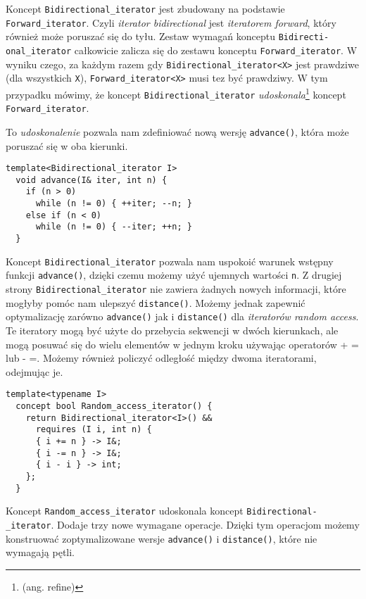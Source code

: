 \documentclass[11pt, a4paper]{article}
\begin{document}
Koncept \verb#Bidirectional_iterator# jest zbudowany na podstawie \newline \verb#Forward_iterator#. Czyli \emph{iterator bidirectional} jest \emph{iteratorem forward}, który również może poruszać się do tyłu. Zestaw wymagań konceptu \verb#Bidirecti-# \newline \verb#onal_iterator# całkowicie zalicza się do zestawu konceptu \verb#Forward_iterator#. W wyniku czego, za każdym razem gdy \verb#Bidirectional_iterator<X># jest prawdziwe (dla wszystkich \verb#X#), \verb#Forward_iterator<X># musi tez być prawdziwy. W tym przypadku mówimy, że koncept \verb#Bidirectional_iterator# \emph{udoskonala}\footnote{(ang. refine)} koncept \verb#Forward_iterator#.

To \emph{udoskonalenie} pozwala nam zdefiniować nową wersję \verb#advance()#, która może poruszać się w oba kierunki.

\begin{lstlisting}[frame=single]
template<Bidirectional_iterator I>
  void advance(I& iter, int n) {
    if (n > 0)
      while (n != 0) { ++iter; --n; }
    else if (n < 0)
      while (n != 0) { --iter; ++n; }
  }
\end{lstlisting}

Koncept \verb#Bidirectional_iterator# pozwala nam uspokoić warunek wstępny funkcji \verb#advance()#, dzięki czemu możemy użyć ujemnych wartości \verb#n#. Z drugiej strony \verb#Bidirectional_iterator# nie zawiera żadnych nowych informacji, które mogłyby pomóc nam ulepszyć \verb#distance()#. Możemy jednak zapewnić optymalizację zarówno \verb#advance()# jak i \verb#distance()# dla \emph{iteratorów random access}. Te iteratory mogą być użyte do przebycia sekwencji w dwóch kierunkach, ale mogą posuwać się do wielu elementów w jednym kroku używając operatorów + = lub - =. Możemy również policzyć odległość między dwoma iteratorami, odejmując je.

\begin{lstlisting}[frame=single]
template<typename I>
  concept bool Random_access_iterator() {
    return Bidirectional_iterator<I>() && 
      requires (I i, int n) {
      { i += n } -> I&;
      { i -= n } -> I&;
      { i - i } -> int;
    };
  }
\end{lstlisting}

Koncept \verb#Random_access_iterator# udoskonala koncept \verb#Bidirectional-# \newline \verb#_iterator#. Dodaje trzy nowe wymagane operacje. Dzięki tym operacjom możemy konstruować zoptymalizowane wersje \verb#advance()# i \verb#distance()#, które nie wymagają pętli.
\end{document}
